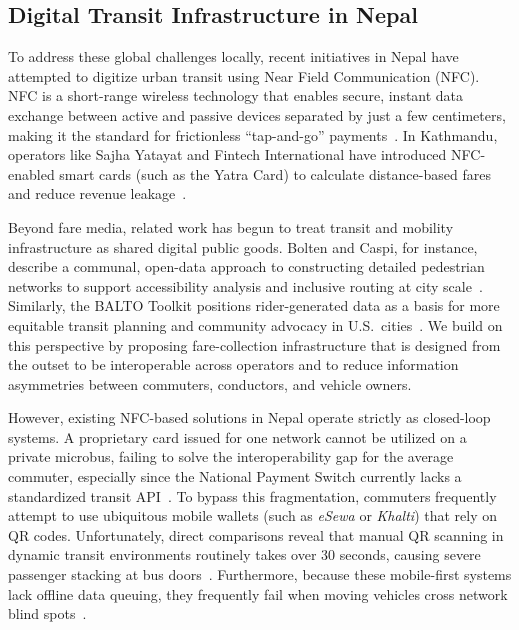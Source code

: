 \documentclass[manuscript,review,anonymous]{acmart}
\begin{document}
\subsection{Digital Transit Infrastructure in Nepal}
To address these global challenges locally, recent initiatives in Nepal have attempted to digitize urban transit using Near Field Communication (NFC). NFC is a short-range wireless technology that enables secure, instant data exchange between active and passive devices separated by just a few centimeters, making it the standard for frictionless ``tap-and-go'' payments~\cite{singh2020near}. In Kathmandu, operators like Sajha Yatayat and Fintech International have introduced NFC-enabled smart cards (such as the Yatra Card) to calculate distance-based fares and reduce revenue leakage~\cite{fintech2023yatra, annapurnaexpress2026article}. 

Beyond fare media, related work has begun to treat transit and mobility infrastructure as shared digital public goods. Bolten and Caspi, for instance, describe a communal, open-data approach to constructing detailed pedestrian networks to support accessibility analysis and inclusive routing at city scale~\cite{bolten2022towards}. Similarly, the BALTO Toolkit positions rider-generated data as a basis for more equitable transit planning and community advocacy in U.S.\ cities~\cite{frias2023balto}. We build on this perspective by proposing fare-collection infrastructure that is designed from the outset to be interoperable across operators and to reduce information asymmetries between commuters, conductors, and vehicle owners.

However, existing NFC-based solutions in Nepal operate strictly as closed-loop systems. A proprietary card issued for one network cannot be utilized on a private microbus, failing to solve the interoperability gap for the average commuter, especially since the National Payment Switch currently lacks a standardized transit API~\cite{nrb2025paymentoversight}. To bypass this fragmentation, commuters frequently attempt to use ubiquitous mobile wallets (such as \textit{eSewa} or \textit{Khalti}) that rely on QR codes. Unfortunately, direct comparisons reveal that manual QR scanning in dynamic transit environments routinely takes over 30 seconds, causing severe passenger stacking at bus doors~\cite{chen2020influence}. Furthermore, because these mobile-first systems lack offline data queuing, they frequently fail when moving vehicles cross network blind spots~\cite{kharel2025digital}. 
\end{document}
